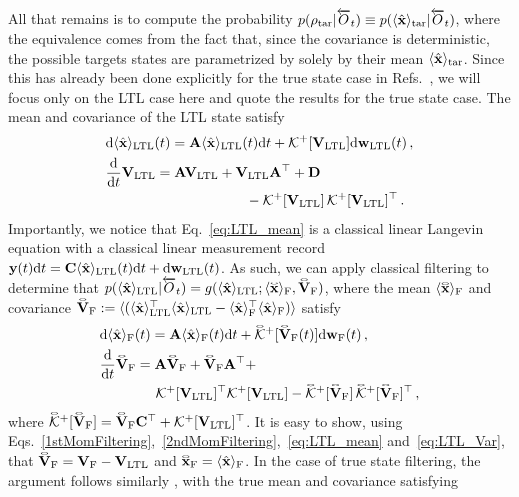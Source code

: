 \documentclass[./Main-revtex.tex]{subfiles}
\begin{document}
All that remains is to compute the probability $p(\rho_{\rm tar}|\overleftarrow{O}_t)\equiv p(\langle \hat{\bf x} \rangle_{\rm tar}|\overleftarrow{O}_t)$, where the equivalence comes from the fact that, since the covariance is deterministic, the possible targets states are parametrized by solely by their mean $\langle \hat{\bf x} \rangle_{\rm tar}$. Since this has already been done explicitly for the true state case in Refs.~\cite{laverick2019quantum,laverick2021quantum}, we will focus only on the LTL case here and quote the results for the true state case. The mean and covariance of the LTL state satisfy  
\begin{align}\label{eq:LTL_mean}
&\dd \ex{\bx}_{\rm LTL}(t) = {\bf A} \ex{\bx}_{\rm LTL}(t) \dd t + {\cal K}^+[{\bf V}_{\rm LTL}] \dd{\bf w}_{\rm LTL}(t)\,,\\
&\frac{\dd}{\dd t}{\bf V}_{\rm LTL} = {\bf A}\mathbf{V}_{\rm LTL} + \mathbf{V}_{\rm LTL}\mathbf{A}\tp + \mathbf{D} \nonumber\\
&\hspace{10em}- \mathcal{K}^{+}[\mathbf{V}_{\rm LTL}]\,\mathcal{K}^{+}[\mathbf{V}_{\rm LTL}]\tp\,.\label{eq:LTL_Var}
\end{align} 
Importantly, we notice that Eq.~\eqref{eq:LTL_mean} is a classical linear Langevin equation with a classical linear measurement record ${\bf y}(t){\rm d} t = {\bf C}\langle \hat{\bf x} \rangle_{\rm LTL}(t){\rm d} t + {\rm d}{\bf w}_{\rm LTL}(t)$. As such, we can apply classical filtering \cite{KalBuc61} to determine that $p(\ex{\bx}_{\rm LTL}|\past{O}_t) = g(\ex{\bx}_{\rm LTL};\ex{\halo{\bf x}}\fil, \halo{{\bf V}}\fil)$, where the mean $\ex{\halo{\bf x}}\fil$ and covariance $\halo{{\bf V}}\fil := \ex{(\ex{\bx}_{\rm LTL}\tp\ex{\bx}_{\rm LTL} - \ex{\bx}\fil\tp\ex{\bx}\fil)}$ satisfy
\begin{align}
&\dd\ex{\bx}\fil(t) = {\bf A}\ex{\bx}\fil(t)\dd t + \halo{\cal K}^{+}[\halo{\bf V}\fil(t)]\dd \mathbf{w}\fil(t)\,,\\
&\frac{\dd}{\dd t}\halo{\bf V}\fil = {\bf A}\halo{\bf V}\fil + \halo{\bf V}\fil{\bf A}\tp + \nonumber\\
&\hspace{4em}{\cal K}^+[{\bf V}_{\rm LTL}]\tp{\cal K}^+[{\bf V}_{\rm LTL}] -\halo{\cal K}^{+}[\halo{\bf V}\fil]\,\halo{\cal K}^{+}[\halo{\bf V}\fil]\tp\,,
\end{align}
where $\halo{\cal K}^{+}[\halo{\bf V}\fil] = \halo{\bf V}\fil {\bf C}\tp + {\cal K}^+[{\bf V}_{\rm LTL}]\tp$. It is easy to show, using Eqs.~\eqref{1stMomFiltering},~\eqref{2ndMomFiltering},~\eqref{eq:LTL_mean} and~\eqref{eq:LTL_Var}, that $\halo{{\bf V}}\fil = {\bf V}\fil - {\bf V}_{\rm LTL}$ and $\halo{\bf x}\fil = \ex{\bx}\fil$. In the case of true state filtering, the argument follows similarly \cite{laverick2019quantum}, with the true mean and covariance satisfying 
\end{document}
